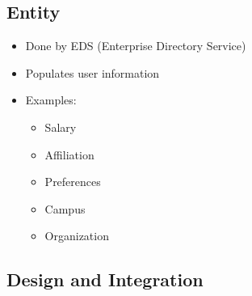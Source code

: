 \documentclass[12pt,notitlepage]{article}
\begin{document}
\begin{s5presentation}
  \W \begin{s5slide}
    \W \section{Entity}
    \begin{itemize}
      \item Done by EDS (Enterprise Directory Service)
      \item  Populates user information
      \item Examples:
        \begin{itemize}
          \item Salary
          \item Affiliation
          \item Preferences
          \item Campus
          \item Organization
        \end{itemize}
        
    \end{itemize}
    \W \begin{s5notes}
    \W \end{s5notes}
    \W \end {s5slide}

  \W \begin{s5slide}
    \W \section{Design and Integration}
    \W \begin{s5notes}
    \W \end{s5notes}
    \W \end {s5slide}
  \W \end{s5presentation}
\end{document}
